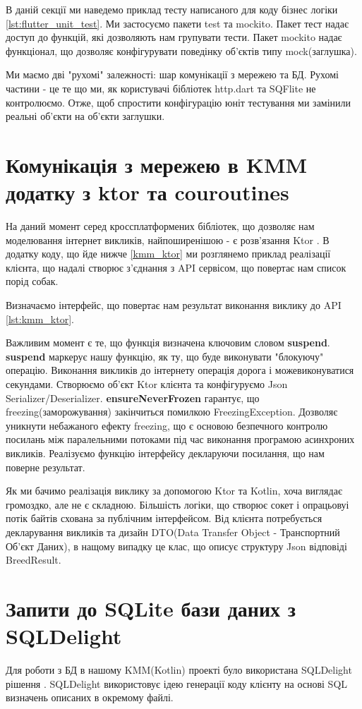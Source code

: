 В даній секції ми наведемо приклад тесту написаного для коду бізнес логіки \ref{lst:flutter_unit_test}.
Ми застосуємо пакети test та mockito.
Пакет тест надає доступ до функцій, які дозволяють нам групувати тести.
Пакет mockito надає функціонал, що дозволяє конфігурувати поведінку об'єктів типу mock(заглушка).

Ми маємо дві "рухомі" залежності: шар комунікації з мережею та БД.
Рухомі частини - це те що ми, як користувачі бібліотек http.dart та SQFlite не контролюємо.
Отже, щоб спростити конфігурацію юніт тестування ми замінили реальні об'єкти на об'єкти заглушки.


\section{Комунікація з мережею в KMM додатку з ktor та couroutines}
\label{sec:kmm_ktor}
На даний момент серед кроссплатформених бібліотек, що дозволяє нам моделювання інтернет викликів,
найпоширенішою - є розв'язання Ktor \cite{ktor_home_page}.
В додатку коду, що йде нижче \ref{kmm_ktor} ми розглянемо приклад реалізації клієнта,
що надалі створює з'єднання з API сервісом, що повертає нам список порід собак.

Визначаємо інтерфейс, що повертає нам результат виконання виклику до API \ref{lst:kmm_ktor}.

Важливим момент є те, що функція визначена ключовим словом \textbf{suspend}.
\textbf{suspend} маркерує нашу функцію, як ту, що буде виконувати "блокуючу" операцію.
Виконання викликів до інтернету операція дорога і можевиконуватися секундами.
Створюємо об'єкт Ktor клієнта та конфігуруємо Json Serializer/Deserializer.
\textbf{ensureNeverFrozen} гарантує, що freezing(заморожування) закінчиться помилкою FreezingException.
Дозволяє уникнути небажаного ефекту freezing, що є основою безпечного контролю посилань між паралельними потоками
під час виконання програмою асинхроних викликів.
Реалізуємо функцію інтерфейсу декларуючи посилання, що нам поверне результат.

Як ми бачимо реалізація виклику за допомогою Ktor та Kotlin, хоча виглядає громоздко, але не є складною.
Більшість логіки, що створює сокет і опрацьовуі потік байтів схована за публічним інтерфейсом.
Від клієнта потребується декларування викликів та дизайн DTO(Data Transfer Object - Транспортний Об'єкт Даних),
в нащому випадку це клас, що описує структуру Json відповіді BreedResult.


\section{Запити до SQLite бази даних з SQLDelight}
\label{sec:kmm_sqldelight}
Для роботи з БД в нашому KMM(Kotlin) проекті було використана SQLDelight рішення \cite{sqldelight_home}.
SQLDelight використовує ідею генерації коду клієнту на основі SQL визначень описаних в окремому файлі.

